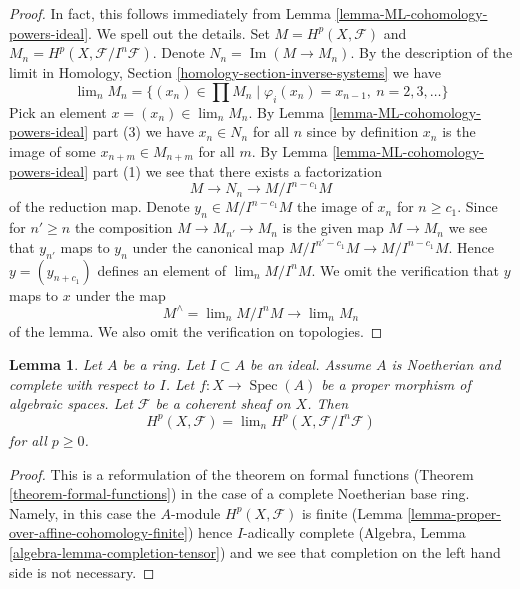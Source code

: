 \documentclass{stacks-project}
\theoremstyle{plain}
\newtheorem{lemma}[subsection]{Lemma}
\theoremstyle{definition}
\theoremstyle{remark}
\numberwithin{equation}{subsection}
\def\lim{\mathop{\mathrm{lim}}\nolimits}
\def\Spec{\mathop{\mathrm{Spec}}}
\def\Im{\mathop{\mathrm{Im}}}
\begin{document}
\begin{proof}
In fact, this follows immediately from
Lemma \ref{lemma-ML-cohomology-powers-ideal}. We spell out the details.
Set $M = H^p(X, \mathcal{F})$ and $M_n = H^p(X, \mathcal{F}/I^n\mathcal{F})$.
Denote $N_n = \Im(M \to M_n)$.
By the description of the limit in Homology, Section
\ref{homology-section-inverse-systems} we have
$$
\lim_n M_n
=
\{(x_n) \in \prod M_n \mid \varphi_i(x_n) = x_{n - 1}, \ n = 2, 3, \ldots\}
$$
Pick an element $x = (x_n) \in \lim_n M_n$.
By Lemma \ref{lemma-ML-cohomology-powers-ideal} part (3)
we have $x_n \in N_n$ for all $n$ since by
definition $x_n$ is the image of some $x_{n + m} \in M_{n + m}$ for
all $m$. By Lemma \ref{lemma-ML-cohomology-powers-ideal} part (1)
we see that there exists a factorization
$$
M \to N_n \to M/I^{n - c_1}M
$$
of the reduction map. Denote $y_n \in M/I^{n - c_1}M$ the image of $x_n$
for $n \geq c_1$. Since for $n' \geq n$ the composition
$M \to M_{n'} \to M_n$ is the given map $M \to M_n$ we see that
$y_{n'}$ maps to $y_n$ under the canonical map
$M/I^{n' - c_1}M \to M/I^{n - c_1}M$. Hence $y = (y_{n + c_1})$
defines an element of $\lim_n M/I^nM$.
We omit the verification that $y$ maps to $x$ under the
map
$$
M^\wedge = \lim_n M/I^nM \longrightarrow \lim_n M_n
$$
of the lemma. We also omit the verification on topologies.
\end{proof}

\begin{lemma}
\label{lemma-spell-out-theorem-formal-functions}
Let $A$ be a ring. Let $I \subset A$ be an ideal. Assume $A$ is
Noetherian and complete with respect to $I$.
Let $f : X \to \Spec(A)$ be a proper morphism of algebraic spaces.
Let $\mathcal{F}$ be a coherent sheaf on $X$. Then
$$
H^p(X, \mathcal{F}) = \lim_n H^p(X, \mathcal{F}/I^n\mathcal{F})
$$
for all $p \geq 0$.
\end{lemma}

\begin{proof}
This is a reformulation of the theorem on formal functions
(Theorem \ref{theorem-formal-functions}) in the
case of a complete Noetherian base ring. Namely, in this case the
$A$-module $H^p(X, \mathcal{F})$ is finite
(Lemma \ref{lemma-proper-over-affine-cohomology-finite}) hence
$I$-adically complete (Algebra, Lemma \ref{algebra-lemma-completion-tensor})
and we see that completion on the left hand side is not necessary.
\end{proof}
\end{document}
